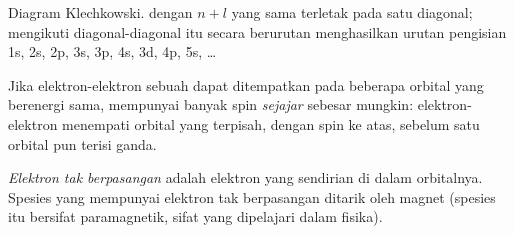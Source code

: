 \begin{omfigure}

{\small Diagram Klechkowski.  dengan $n + l$ yang sama
terletak pada satu diagonal; mengikuti diagonal-diagonal itu secara
berurutan menghasilkan urutan pengisian 1s, 2s, 2p, 3s, 3p, 4s, 3d, 4p,
5s, \dots}
\end{omfigure}

\begin{proposition}\label{prop:b1:quantum-numbers:hund}
Jika elektron-elektron sebuah  dapat ditempatkan pada beberapa
orbital yang berenergi sama,  mempunyai banyak spin
\emph{sejajar} sebesar mungkin: elektron-elektron menempati orbital yang
terpisah, dengan spin ke atas, sebelum satu orbital pun terisi ganda.
\end{proposition}
\admitted

\begin{definition}\label{def:b1:quantum-numbers:unpaired}
\emph{Elektron tak berpasangan} adalah
elektron yang sendirian di dalam orbitalnya. Spesies yang mempunyai
elektron tak berpasangan ditarik oleh magnet (spesies itu bersifat
paramagnetik, sifat yang dipelajari dalam fisika).
\end{definition}

